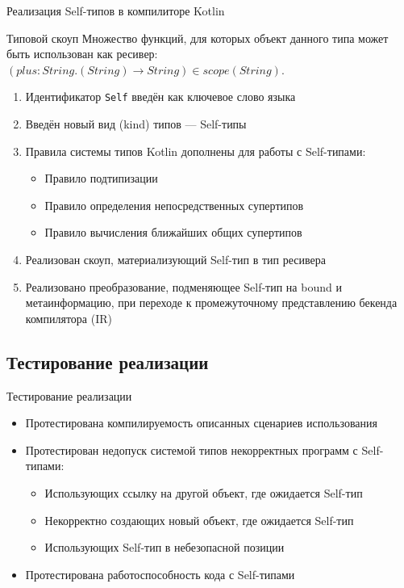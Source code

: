 \documentclass[aspectratio=169,usenames,dvipsnames]{beamer}
\begin{document}
    \begin{frame}{Реализация Self-типов в компилиторе Kotlin}

        \begin{block}{Типовой скоуп}
            Множество функций, для которых объект данного типа может быть использован как ресивер: $(plus : String.(String) \to String) \in scope(String)$.
        \end{block}

        \begin{enumerate}
            \item Идентификатор \texttt{Self} введён как ключевое слово языка
            \item Введён новый вид (kind) типов --- Self-типы
            \item Правила системы типов Kotlin дополнены для работы с Self-типами:
            \begin{itemize}
                \item Правило подтипизации
                \item Правило определения непосредственных супертипов
                \item Правило вычисления ближайших общих супертипов
            \end{itemize}
            \item Реализован скоуп, материализующий Self-тип в тип ресивера
            \item Реализовано преобразование, подменяющее Self-тип на bound и метаинформацию, при переходе к промежуточному представлению бекенда компилятора (IR)
        \end{enumerate}
    \end{frame}


    \subsection{Тестирование реализации}

    \begin{frame}{Тестирование реализации}

        \begin{itemize}
            \item Протестирована компилируемость описанных сценариев использования
            \item Протестирован недопуск системой типов некорректных программ с Self-типами:
            \begin{itemize}
                \item Использующих ссылку на другой объект, где ожидается Self-тип
                \item Некорректно создающих новый объект, где ожидается Self-тип
                \item Использующих Self-тип в небезопасной позиции
            \end{itemize}
            \item Протестирована работоспособность кода с Self-типами
        \end{itemize}
    \end{frame}
\end{document}
